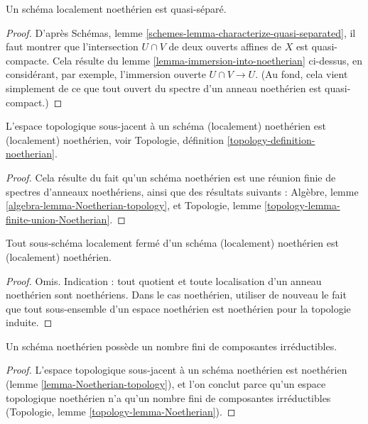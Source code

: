\begin{lemma}
\label{lemma-locally-Noetherian-quasi-separated}
Un schéma localement noethérien est quasi-séparé.
\end{lemma}

\begin{proof}
D'après Schémas, lemme \ref{schemes-lemma-characterize-quasi-separated},
il faut montrer que l'intersection $U \cap V$ de deux
ouverts affines de $X$ est quasi-compacte. Cela résulte du
lemme \ref{lemma-immersion-into-noetherian} ci-dessus,
en considérant, par exemple, l'immersion ouverte $U \cap V \to U$. (Au fond,
cela vient simplement de ce que tout ouvert du spectre d'un
anneau noethérien est quasi-compact.)
\end{proof}

\begin{lemma}
\label{lemma-Noetherian-topology}
L'espace topologique sous-jacent à un schéma
(localement) noethérien est (localement) noethérien,
voir Topologie, définition \ref{topology-definition-noetherian}.
\end{lemma}

\begin{proof}
Cela résulte du fait qu'un schéma noethérien est une réunion finie de spectres d'anneaux
noethériens, ainsi que des résultats
suivants : Algèbre, lemme \ref{algebra-lemma-Noetherian-topology}, et
Topologie, lemme \ref{topology-lemma-finite-union-Noetherian}.
\end{proof}

\begin{lemma}
\label{lemma-locally-closed-in-Noetherian}
Tout sous-schéma localement fermé d'un schéma (localement)
noethérien est (localement) noethérien.
\end{lemma}

\begin{proof}
Omis. Indication : tout quotient et toute localisation d'un anneau
noethérien sont noethériens. Dans le cas noethérien, utiliser de
nouveau le fait que tout sous-ensemble d'un espace noethérien est
noethérien pour la topologie induite.
\end{proof}

\begin{lemma}
\label{lemma-Noetherian-irreducible-components}
Un schéma noethérien possède un nombre fini de composantes irréductibles.
\end{lemma}

\begin{proof}
L'espace topologique sous-jacent à un schéma noethérien est noethérien
(lemme \ref{lemma-Noetherian-topology}),
et l'on conclut parce qu'un espace topologique noethérien
n'a qu'un nombre fini de composantes irréductibles
(Topologie, lemme \ref{topology-lemma-Noetherian}).
\end{proof}

